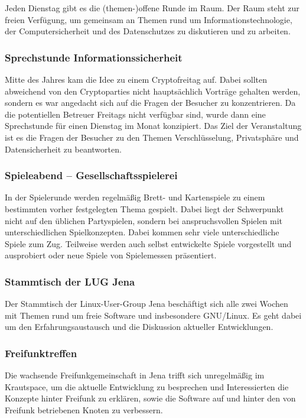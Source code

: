 \documentclass[ngerman]{scrartcl}
\begin{document}
Jeden Dienstag gibt es die (themen-)offene Runde im Raum. Der Raum
steht zur freien Verfügung, um gemeinsam an Themen rund um
Informationstechnologie, der Computersicherheit und des Datenschutzes
zu diskutieren und zu arbeiten.

\subsubsection{Sprechstunde Informationssicherheit}

Mitte des Jahres kam die Idee zu einem Cryptofreitag auf. Dabei
sollten abweichend von den Cryptoparties nicht hauptsächlich Vorträge
gehalten werden, sondern es war angedacht sich auf die Fragen der
Besucher zu konzentrieren.  Da die potentiellen Betreuer Freitags
nicht verfügbar sind, wurde dann eine Sprechstunde für einen Dienstag
im Monat konzipiert.  Das Ziel der Veranstaltung ist es die Fragen der
Besucher zu den Themen Verschlüsselung, Privatsphäre und
Datensicherheit zu beantworten.

\subsubsection{Spieleabend -- Gesellschaftsspielerei}

In der Spielerunde werden regelmäßig Brett- und Kartenspiele zu einem
bestimmten vorher festgelegten Thema gespielt. Dabei liegt der
Schwerpunkt nicht auf den üblichen Partyspielen, sondern bei
anspruchsvollen Spielen mit unterschiedlichen Spielkonzepten. Dabei
kommen sehr viele unterschiedliche Spiele zum Zug. Teilweise werden
auch selbst entwickelte Spiele vorgestellt und ausprobiert oder neue
Spiele von Spielemessen präsentiert.

\subsubsection{Stammtisch der LUG Jena}

Der Stammtisch der Linux-User-Group Jena beschäftigt sich alle zwei
Wochen mit Themen rund um freie Software und insbesondere
GNU/Linux. Es geht dabei um den Erfahrungsaustausch und die Diskussion
aktueller Entwicklungen.

\subsubsection{Freifunktreffen}

Die wachsende Freifunkgemeinschaft in Jena trifft sich unregelmäßig im
Krautspace, um die aktuelle Entwicklung zu besprechen und
Interessierten die Konzepte hinter Freifunk zu erklären, sowie die
Software auf und hinter den von Freifunk betriebenen Knoten zu
verbessern.
\end{document}
